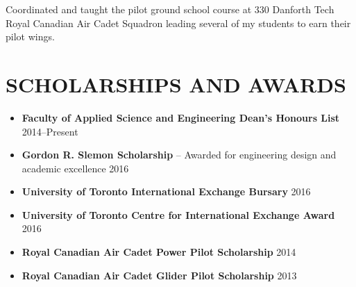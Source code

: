 \documentclass{ResumeTemplate}
\begin{document}
    
    \workitemsone
    {Coordinated and taught the pilot ground school course at 330 Danforth Tech Royal Canadian Air Cadet Squadron leading several of my students to earn their pilot wings.}

    \section{SCHOLARSHIPS AND AWARDS}
    \begin{itemize}[noitemsep, leftmargin=*]
        \item \textbf{Faculty of Applied Science and Engineering Dean's Honours List} \hfill 2014--Present
        \item \textbf{Gordon R. Slemon Scholarship} -- Awarded for engineering design and academic excellence \hfill 2016
        \item \textbf{University of Toronto International Exchange Bursary} \hfill 2016
        \item \textbf{University of Toronto Centre for International Exchange Award} \hfill 2016
        \item \textbf{Royal Canadian Air Cadet Power Pilot Scholarship} \hfill 2014
        \item \textbf{Royal Canadian Air Cadet Glider Pilot Scholarship} \hfill 2013\vspace*{-\baselineskip}
    \end{itemize}
\end{document}
